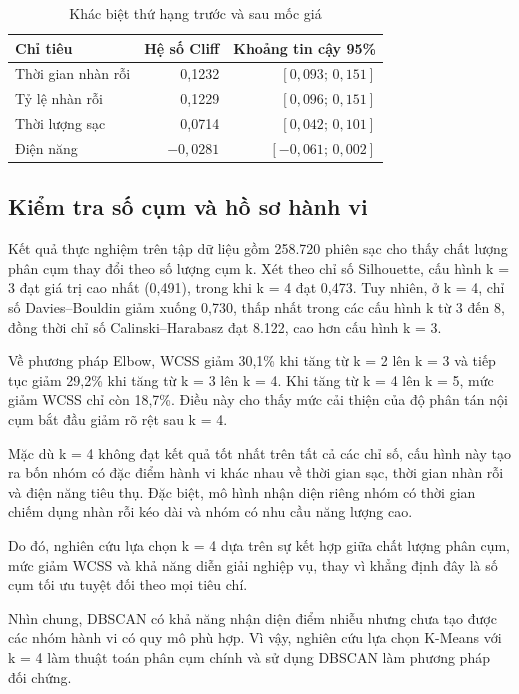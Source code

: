 \documentclass[conference,a4paper]{IEEEtran}
\begin{document}
\begin{table}[!t]
\caption{Khác biệt thứ hạng trước và sau mốc giá}
\label{tab:policy}
\centering\footnotesize
\begin{tabularx}{\columnwidth}{@{}Xrr@{}}
\toprule
\textbf{Chỉ tiêu} & \textbf{Hệ số Cliff} & \textbf{Khoảng tin cậy 95\%} \\
\midrule
Thời gian nhàn rỗi & 0,1232 & $[0{,}093;\,0{,}151]$ \\
Tỷ lệ nhàn rỗi & 0,1229 & $[0{,}096;\,0{,}151]$ \\
Thời lượng sạc & 0,0714 & $[0{,}042;\,0{,}101]$ \\
Điện năng & $-0{,}0281$ & $[-0{,}061;\,0{,}002]$ \\
\bottomrule
\end{tabularx}
\end{table}

\subsection{Kiểm tra số cụm và hồ sơ hành vi}

Kết quả thực nghiệm trên tập dữ liệu gồm 258.720 phiên sạc cho thấy chất lượng phân cụm thay đổi theo số lượng cụm k. Xét theo chỉ số Silhouette, cấu hình k = 3 đạt giá trị cao nhất (0,491), trong khi k = 4 đạt 0,473. Tuy nhiên, ở k = 4, chỉ số Davies–Bouldin giảm xuống 0,730, thấp nhất trong các cấu hình k từ 3 đến 8, đồng thời chỉ số Calinski–Harabasz đạt 8.122, cao hơn cấu hình k = 3.

Về phương pháp Elbow, WCSS giảm 30,1\% khi tăng từ k = 2 lên k = 3 và tiếp tục giảm 29,2\% khi tăng từ k = 3 lên k = 4. Khi tăng từ k = 4 lên k = 5, mức giảm WCSS chỉ còn 18,7\%. Điều này cho thấy mức cải thiện của độ phân tán nội cụm bắt đầu giảm rõ rệt sau k = 4.

Mặc dù k = 4 không đạt kết quả tốt nhất trên tất cả các chỉ số, cấu hình này tạo ra bốn nhóm có đặc điểm hành vi khác nhau về thời gian sạc, thời gian nhàn rỗi và điện năng tiêu thụ. Đặc biệt, mô hình nhận diện riêng nhóm có thời gian chiếm dụng nhàn rỗi kéo dài và nhóm có nhu cầu năng lượng cao.

Do đó, nghiên cứu lựa chọn k = 4 dựa trên sự kết hợp giữa chất lượng phân cụm, mức giảm WCSS và khả năng diễn giải nghiệp vụ, thay vì khẳng định đây là số cụm tối ưu tuyệt đối theo mọi tiêu chí.

Nhìn chung, DBSCAN có khả năng nhận diện điểm nhiễu nhưng chưa tạo được các nhóm hành vi có quy mô phù hợp. Vì vậy, nghiên cứu lựa chọn K-Means với k = 4 làm thuật toán phân cụm chính và sử dụng DBSCAN làm phương pháp đối chứng.
\end{document}
